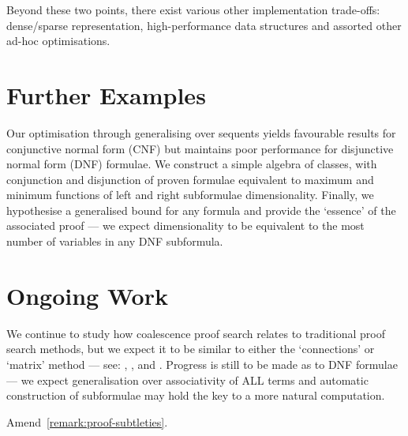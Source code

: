         Beyond these two points, there exist various other implementation trade-offs: dense/sparse representation, high-performance data structures and assorted other ad-hoc optimisations.

    \section*{Further Examples}
        Our optimisation through generalising over sequents yields favourable results for conjunctive normal form (CNF) but maintains poor performance for disjunctive normal form (DNF) formulae.
        We construct a simple algebra of classes, with conjunction and disjunction of proven formulae equivalent to maximum and minimum functions of left and right subformulae dimensionality.
        Finally, we hypothesise a generalised bound for any formula and provide the `essence' of the associated proof --- we expect dimensionality to be equivalent to the most number of variables in any DNF subformula.

    \section*{Ongoing Work}
        We continue to study how coalescence proof search relates to traditional proof search methods, but we expect it to be similar to either the `connections' or `matrix' method --- see: \citet{tableaux-for-logic-of-proofs}, \citet{matrices-with-connections}, \citet{connection-based-proof-method} and \citet{proving-by-matings}.
        Progress is still to be made as to DNF formulae --- we expect generalisation over associativity of ALL terms and automatic construction of subformulae may hold the key to a more natural computation.
   
    Amend~\ref{remark:proof-subtleties}.
